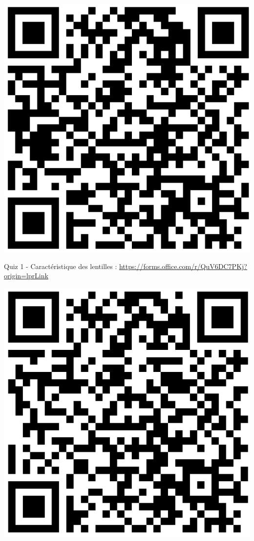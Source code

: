 \documentclass[french, a4paper, 12pt]{article}
\begin{document}
\begin{center}
	\begin{minipage}{.25\textwidth}
		\centering
		\includegraphics[width=.7\textwidth]{Quiz1.png}
		
		Quiz 1 - Caractéristique des lentilles : \url{https://forms.office.com/r/QuV6DC7PKj?origin=lprLink}
	\end{minipage}\hspace{1cm}
	\begin{minipage}{.25\textwidth}
		\centering
		\includegraphics[width=.7\textwidth]{Quiz2.png}


\end{minipage}
\end{center}
\end{document}
